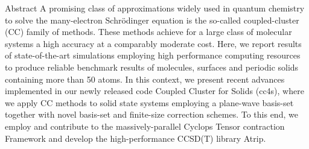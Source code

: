 \begin{block}{\large Abstract}
  A promising class of approximations widely used in quantum chemistry
  to solve the many-electron Schrödinger equation is the so-called
  coupled-cluster (CC) family of methods.
  These methods achieve for a large
  class of molecular systems a high accuracy at a comparably moderate
  cost.  Here, we report results of state-of-the-art simulations
  employing high performance computing resources to produce reliable
  benchmark results of molecules, surfaces and periodic solids
  containing more than 50 atoms.  In this context, we present recent
  advances implemented in our newly released code Coupled Cluster for
  Solids (cc4s), where we apply CC methods to solid state systems
  employing a plane-wave basis-set together with novel basis-set and
  finite-size correction schemes. To this end, we employ and contribute to
  the massively-parallel Cyclops Tensor contraction Framework and
  develop the high-performance CCSD(T) library Atrip.
\end{block}

